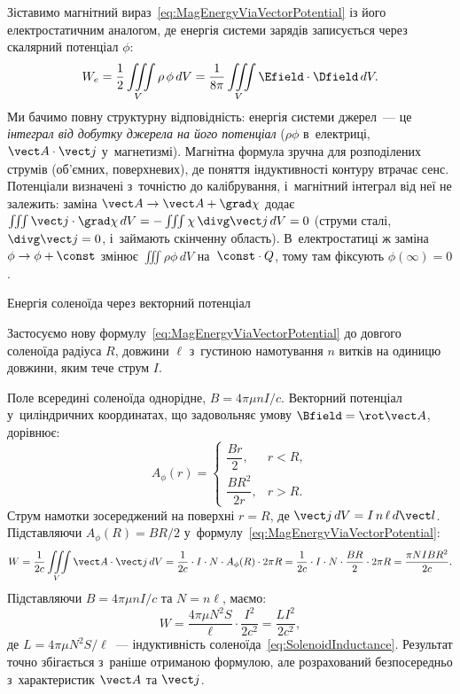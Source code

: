 Зіставимо магнітний вираз~\eqref{eq:MagEnergyViaVectorPotential} із його електростатичним
аналогом, де енергія системи зарядів записується через скалярний потенціал $\phi$:
\begin{equation*}
	W_e = \frac12\iiint\limits_V \rho\,\phi\,dV
	= \frac1{8\pi}\iiint\limits_V \Efield\cdot\Dfield\,dV.
\end{equation*}
Ми бачимо повну структурну відповідність: енергія системи джерел~--- це \emph{інтеграл від добутку джерела на його потенціал} ($\rho\phi$ в~електриці, $\vect A\cdot\vect j$ у~магнетизмі). Магнітна формула зручна для розподілених струмів (об'ємних, поверхневих), де поняття індуктивності контуру втрачає сенс. Потенціали визначені з~точністю до калібрування, і~магнітний інтеграл від неї не залежить: заміна $\vect A\to\vect A+\grad\chi$ додає $\iiint\vect j\cdot\grad\chi\,dV=-\iiint\chi\,\divg\vect j\,dV=0$ (струми сталі, $\divg\vect j=0$, і~займають скінченну область). В~електростатиці ж заміна $\phi\to\phi+\const$ змінює $\iiint\rho\phi\,dV$ на~$\const\cdot Q$, тому там фіксують $\phi(\infty)=0$.


\begin{Example}{Енергія соленоїда через векторний потенціал}

	Застосуємо нову формулу~\eqref{eq:MagEnergyViaVectorPotential} до довгого соленоїда
	радіуса $R$, довжини $\ell$ з~густиною намотування $n$ витків на одиницю довжини, яким
	тече струм $I$.

	Поле всередині соленоїда однорідне, $B=4\pi\mu nI/c$. Векторний потенціал
	у~циліндричних координатах, що задовольняє умову $\Bfield=\rot\vect A$, дорівнює:
	\begin{equation}\label{eq:SolenoidVectorPotential}
		A_\phi(r) =
		\begin{cases}
			\dfrac{B r}{2},    & r < R, \\[10pt]
			\dfrac{B R^2}{2r}, & r > R.
		\end{cases}
	\end{equation}
	Струм намотки зосереджений на поверхні $r=R$, де $\vect j\,dV = I\,n\,\ell\,d\vect l$.
	Підставляючи $A_\phi(R) = BR/2$ у~формулу~\eqref{eq:MagEnergyViaVectorPotential}:
	\begin{equation*}
		W = \frac1{2c}\iiint\limits_V \vect A\cdot\vect j\,dV
		= \frac1{2c}\cdot I\cdot N\cdot A_\phi(R)\cdot 2\pi R
		= \frac1{2c}\cdot I\cdot N\cdot \frac{BR}{2}\cdot 2\pi R
		= \frac{\pi N I B R^2}{2c}.
	\end{equation*}
	Підставляючи $B=4\pi\mu nI/c$ та $N=n\ell$, маємо:
	\begin{equation*}
		W = \frac{4\pi\mu N^2 S}{\ell}\cdot\frac{I^2}{2c^2} = \frac{LI^2}{2c^2},
	\end{equation*}
	де $L=4\pi\mu N^2S/\ell$~--- індуктивність соленоїда~\eqref{eq:SolenoidInductance}.
	Результат точно збігається з~раніше отриманою формулою, але розрахований безпосередньо
	з~характеристик $\vect A$ та $\vect j$.
\end{Example}



